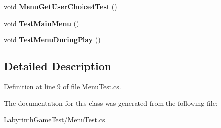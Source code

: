 \begin{DoxyCompactItemize}
\item 
\hypertarget{class_labyrinth_game_test_1_1_menu_test_ad981e2fe5f4a62b9c2cb42845f5ed2e5}{void {\bfseries Menu\+Get\+User\+Choice4\+Test} ()}\label{class_labyrinth_game_test_1_1_menu_test_ad981e2fe5f4a62b9c2cb42845f5ed2e5}

\item 
\hypertarget{class_labyrinth_game_test_1_1_menu_test_ac987aeaee4777f46b96eb638821e65bf}{void {\bfseries Test\+Main\+Menu} ()}\label{class_labyrinth_game_test_1_1_menu_test_ac987aeaee4777f46b96eb638821e65bf}

\item 
\hypertarget{class_labyrinth_game_test_1_1_menu_test_a570bfb5f53160e0bbdcec5c0e08a32a8}{void {\bfseries Test\+Menu\+During\+Play} ()}\label{class_labyrinth_game_test_1_1_menu_test_a570bfb5f53160e0bbdcec5c0e08a32a8}

\end{DoxyCompactItemize}


\subsection{Detailed Description}


Definition at line 9 of file Menu\+Test.\+cs.



The documentation for this class was generated from the following file\+:\begin{DoxyCompactItemize}
\item 
Labyrinth\+Game\+Test/Menu\+Test.\+cs\end{DoxyCompactItemize}
